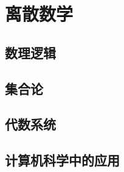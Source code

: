 \part{离散数学}

\chapter{数理逻辑}





\chapter{集合论}




\chapter{代数系统}




\chapter{计算机科学中的应用}






% 
% 